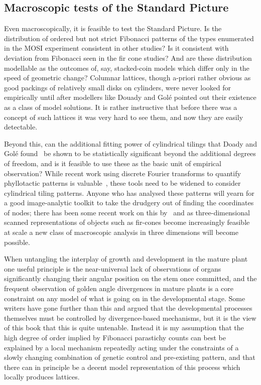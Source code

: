 \subsection{Macroscopic tests of the Standard Picture}
Even macroscopically, it is feasible to test the Standard Picture. Is the distribution of ordered but not strict Fibonacci patterns of the types enumerated in the MOSI experiment consistent in other studies? Is it consistent with deviation from Fibonacci seen in the fir cone studies? And are these distribution modellable as the outcomes of, say, stacked-coin models which differ only in the speed of geometric change? 
Columnar lattices, though a-priori rather obvious as good packings of relatively small disks on cylinders, were never looked for empirically until after modellers like Douady and Golé pointed out their existence as a class of model solutions. It is rather instructive that before there was a concept of such lattices it was very hard to see them, and now they are easily detectable. 


Beyond this, can the additional fitting power of cylindrical tilings that Doady and Golé found~\cite{douadyFibonacciQuasisymmetricPhyllotaxis2016} be shown to be statistically significant beyond the additional degrees of freedom, and is it feasible to use these as the basic unit of empirical observation? While recent work using discrete Fourier transforms to quantify phyllotactic patterns is valuable~\cite{negishiDeterminingParastichyPairs2022}, these tools need to be widened to consider cylindrical tiling patterns. Anyone who has analysed these patterns will yearn for a good image-analytic toolkit to take the drudgery out of finding the coordinates of nodes; there has been some recent work on this by~\cite{aliyevMathematicalModelPlacement2023,aliyevStudyDistributionPhenotypic2024}  and as three-dimensional scanned representations of objects such as fir-cones become increasingly feasible at scale a new class of macroscopic analysis in three dimensions will become possible. 
 

When untangling the interplay of growth and development in the mature plant one useful principle is the near-universal lack of observations of organs significantly changing their angular position on the stem once committed, and the frequent observation of golden angle divergences in mature plants is a core constraint on any model of what is going on in the developmental stage. Some writers have gone further than this and argued that the developmental processes themselves must be controlled by divergence-based mechanisms, but it is the view of this book that this is quite untenable.  Instead it is my assumption that the high degree of order implied by Fibonacci parastichy counts can best be explained by a local mechanism repeatedly acting under the constraints of a slowly changing combination of genetic control and pre-existing pattern, and that there can in principle be a decent model representation of this process which locally produces lattices. 

